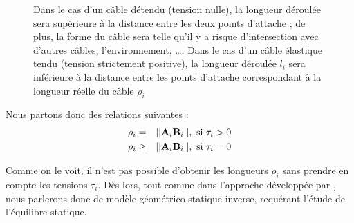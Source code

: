 \begin{figure}[!ht]
  \centering
\hfill
    \caption{\footnotesize{Dans le cas d'un câble détendu (tension nulle), la 
longueur déroulée sera supérieure à la distance entre les deux points d'attache 
; de plus, la forme du câble sera telle qu'il y a risque d'intersection avec 
d'autres câbles, l'environnement, \dots. Dans le cas d'un câble élastique tendu 
(tension strictement positive), la longueur déroulée $l_i$ sera inférieure à la 
distance entre les points d'attache correspondant à la longueur réelle du 
câble $\rho_i$}}
\label{intro:fig6}
\end{figure}

Nous partons donc des relations suivantes :
\begin{eqnarray}
\rho_i &=& ||{\bf A}_i {\bf B}_i||, \hbox{ si } \tau_i > 0 \\ 
\rho_i &\geq& ||{\bf A}_i {\bf B}_i||, \hbox{ si } \tau_i = 0
\label{intro:eq1}
\end{eqnarray}

Comme on le voit, il n'est pas possible d'obtenir les longueurs $\rho_i$ sans 
prendre en compte les tensions $\tau_i$. Dès lors, tout comme dans l'approche 
développée par \cite{2010:Carricato.Merlet}, nous parlerons donc de modèle 
géométrico-statique inverse, requérant l'étude de l'équilibre statique.

